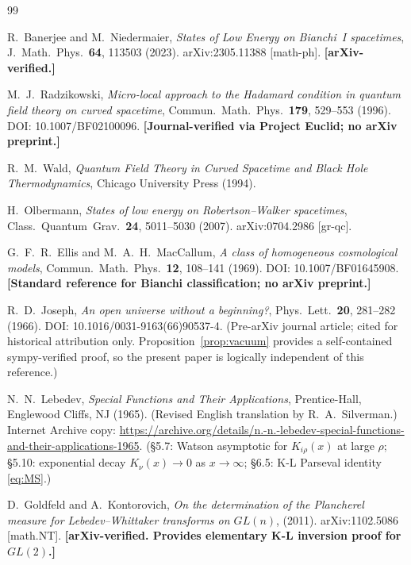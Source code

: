 \documentclass[12pt,letterpaper]{article}
\begin{document}
\begin{thebibliography}{99}

  R.~Banerjee and M.~Niedermaier,
  \textit{States of Low Energy on Bianchi~I spacetimes},
  J.~Math.~Phys.\ \textbf{64}, 113503 (2023).
  arXiv:2305.11388 [math-ph].
  \textbf{[arXiv-verified.]}

  M.~J.~Radzikowski,
  \textit{Micro-local approach to the Hadamard condition in quantum field theory
  on curved spacetime},
  Commun.~Math.~Phys.\ \textbf{179}, 529--553 (1996).
  DOI: 10.1007/BF02100096.
  \textbf{[Journal-verified via Project Euclid; no arXiv preprint.]}

  R.~M.~Wald,
  \textit{Quantum Field Theory in Curved Spacetime and Black Hole Thermodynamics},
  Chicago University Press (1994).

  H.~Olbermann,
  \textit{States of low energy on Robertson--Walker spacetimes},
  Class.~Quantum~Grav.\ \textbf{24}, 5011--5030 (2007).
  arXiv:0704.2986 [gr-qc].

  G.~F.~R.~Ellis and M.~A.~H.~MacCallum,
  \textit{A class of homogeneous cosmological models},
  Commun.~Math.~Phys.\ \textbf{12}, 108--141 (1969).
  DOI: 10.1007/BF01645908.
  \textbf{[Standard reference for Bianchi classification; no arXiv preprint.]}

  R.~D.~Joseph,
  \textit{An open universe without a beginning?},
  Phys.~Lett.\ \textbf{20}, 281--282 (1966).
  DOI: 10.1016/0031-9163(66)90537-4.
  (Pre-arXiv journal article; cited for historical attribution only.
  Proposition~\ref{prop:vacuum} provides a self-contained sympy-verified
  proof, so the present paper is logically independent of this
  reference.)

  N.~N.~Lebedev,
  \textit{Special Functions and Their Applications},
  Prentice-Hall, Englewood Cliffs, NJ (1965).
  (Revised English translation by R.~A.~Silverman.)
  Internet Archive copy:
  \url{https://archive.org/details/n.-n.-lebedev-special-functions-and-their-applications-1965}.
  (\S5.7: Watson asymptotic for $K_{i\rho}(x)$ at large $\rho$;
  \S5.10: exponential decay $K_\nu(x)\to 0$ as $x\to\infty$;
  \S6.5: K-L Parseval identity \eqref{eq:MS}.)

  D.~Goldfeld and A.~Kontorovich,
  \textit{On the determination of the Plancherel measure for
  Lebedev--Whittaker transforms on $GL(n)$},
  (2011).
  arXiv:1102.5086 [math.NT].
  \textbf{[arXiv-verified. Provides elementary K-L inversion proof for $GL(2)$.]}


\end{thebibliography}
\end{document}
